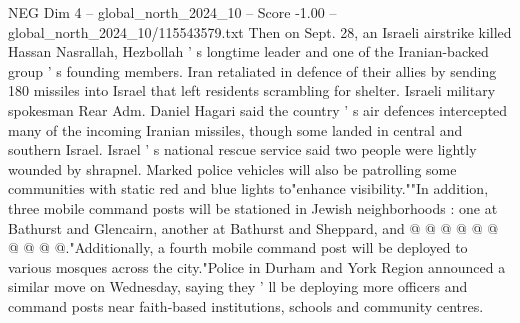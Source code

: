 \begin{textsample}{NEG Dim 4 – global\_north\_2024\_10 – Score -1.00 – global\_north\_2024\_10/115543579.txt}
Then on Sept. 28, an Israeli airstrike killed Hassan Nasrallah, Hezbollah ' s longtime leader and one of the Iranian-backed group ' s founding members.
Iran retaliated in defence of their allies by sending 180 missiles into Israel that left residents scrambling for shelter.
Israeli military spokesman Rear Adm.
Daniel Hagari said the country ' s air defences intercepted many of the incoming Iranian missiles, though some landed in central and southern Israel.
Israel ' s national rescue service said two people were lightly wounded by shrapnel.
Marked police vehicles will also be patrolling some communities with static red and blue lights to"enhance visibility.""In addition, three mobile command posts will be stationed in Jewish neighborhoods : one at Bathurst and Glencairn, another at Bathurst and Sheppard, and @ @ @ @ @ @ @ @ @ @."Additionally, a fourth mobile command post will be deployed to various mosques across the city."Police in Durham and York Region announced a similar move on Wednesday, saying they ' ll be deploying more officers and command posts near faith-based institutions, schools and community centres.

\end{textsample}
